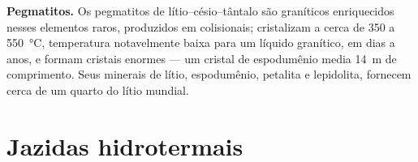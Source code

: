 \textbf{Pegmatitos.} Os pegmatitos de lítio--césio--tântalo são  graníticos enriquecidos nesses elementos
raros, produzidos em  colisionais; cristalizam a cerca de 350 a \qty{550}{\celsius},
temperatura notavelmente baixa para um líquido granítico, em dias a anos, e formam cristais enormes --- um
cristal de espodumênio media \qty{14}{m} de comprimento. Seus minerais de lítio, espodumênio, petalita e
lepidolita, fornecem cerca de um quarto do lítio mundial.

\section{Jazidas hidrotermais}\label{sec:b2:ore-deposits:hydrothermal}


